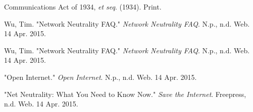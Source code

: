 \documentclass[11pt]{article}
\begin{document}
\begin{thebibliography}{9}
	Communications Act of 1934,
  	\emph{et seq}.
  	(1934). Print.

	Wu, Tim.
	"Network Neutrality FAQ."
  	\emph{Network Neutrality FAQ}.
  	N.p., n.d. Web. 14 Apr. 2015.

	Wu, Tim.
	"Network Neutrality FAQ."
  	\emph{Network Neutrality FAQ}.
  	N.p., n.d. Web. 14 Apr. 2015.

	"Open Internet."
  	\emph{Open Internet}.
  	N.p., n.d. Web. 14 Apr. 2015.

	"Net Neutrality: What You Need to Know Now."
  	\emph{Save the Internet}.
  	Freepress, n.d. Web. 14 Apr. 2015.
\end{thebibliography}
\end{document}
